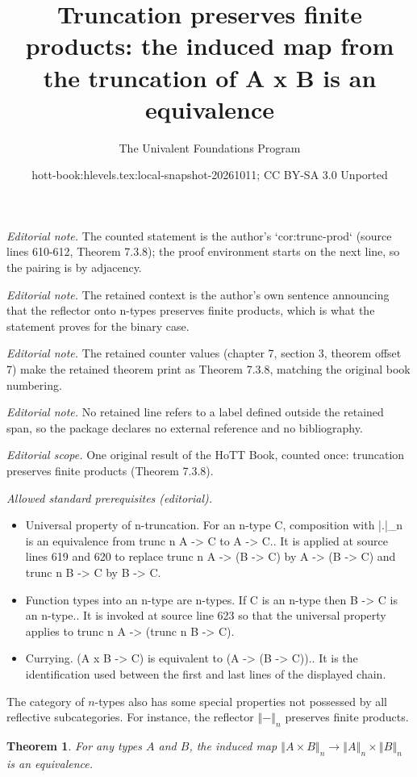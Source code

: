 \documentclass[10pt,a4paper]{article}
\title{Truncation preserves finite products: the induced map from the truncation of A x B is an equivalence}
\author{The Univalent Foundations Program}
\date{hott-book:hlevels.tex:local-snapshot-20261011; CC BY-SA 3.0 Unported}
\newcounter{chapter}
\newcommand{\trunc}[2]{\mathopen{}\left\Vert #2\right\Vert_{#1}\mathclose{}}
\newtheorem{thm}{Theorem}[section]
\theoremstyle{definition}
\theoremstyle{remark}
\numberwithin{equation}{section}
\begin{document}
\maketitle
\setcounter{chapter}{7}
\setcounter{section}{3}
\setcounter{thm}{7}
\noindent\textit{Editorial note.} The counted statement is the author's `cor:trunc-prod` (source lines 610-612, Theorem 7.3.8); the proof environment starts on the next line, so the pairing is by adjacency.\par\medskip
\noindent\textit{Editorial note.} The retained context is the author's own sentence announcing that the reflector onto n-types preserves finite products, which is what the statement proves for the binary case.\par\medskip
\noindent\textit{Editorial note.} The retained counter values (chapter 7, section 3, theorem offset 7) make the retained theorem print as Theorem 7.3.8, matching the original book numbering.\par\medskip
\noindent\textit{Editorial note.} No retained line refers to a label defined outside the retained span, so the package declares no external reference and no bibliography.\par\medskip
\noindent\textit{Editorial scope.} One original result of the HoTT Book, counted once: truncation preserves finite products (Theorem 7.3.8).\par\medskip
\noindent\textit{Allowed standard prerequisites (editorial).}\begin{itemize}
\item Universal property of n-truncation. For an n-type C, composition with |.|\_n is an equivalence from trunc n A -> C to A -> C.. It is applied at source lines 619 and 620 to replace trunc n A -> (B -> C) by A -> (B -> C) and trunc n B -> C by B -> C.
\item Function types into an n-type are n-types. If C is an n-type then B -> C is an n-type.. It is invoked at source line 623 so that the universal property applies to trunc n A -> (trunc n B -> C).
\item Currying. (A x B -> C) is equivalent to (A -> (B -> C)).. It is the identification used between the first and last lines of the displayed chain.
\end{itemize}\medskip
The category of $n$-types also has some special properties not possessed by all reflective subcategories.
For instance, the reflector $\trunc n-$ preserves finite products.


\begin{thm}\label{cor:trunc-prod}
  For any types $A$ and $B$, the induced map $\trunc n{A\times B} \to \trunc nA \times \trunc nB$ is an equivalence.
\end{thm}
\end{document}
